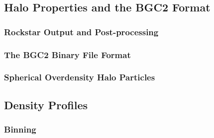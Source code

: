 \subsection{Halo Properties and the BGC2 Format}
\label{subsec:analysis--halo_properties}



\subsubsection{Rockstar Output and Post-processing}
\label{subsubsec:analysis--halo_properties--output}



\subsubsection{The BGC2 Binary File Format}
\label{subsubsec:analysis--halo_properties--bgc2}



\subsubsection{Spherical Overdensity Halo Particles}
\label{subsubsec:analysis--halo_properties--spherical_overdensity}




\subsection{Density Profiles}
\label{subsec:analysis--denisty_profiles}



\subsubsection{Binning}
\label{subsubsec:analysis--density_profile--binning}



